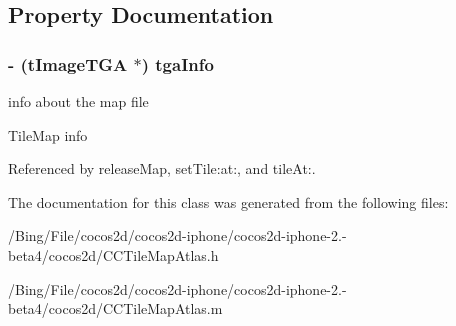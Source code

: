 \subsection{Property Documentation}
\hypertarget{interface_c_c_tile_map_atlas_aaeb4d528af3807a86bd3ea58f0ce27d0}{
\subsubsection[{tga\-Info}]{\setlength{\rightskip}{0pt plus 5cm}-\/ ({\bf t\-Image\-T\-G\-A} $\ast$) {\bf tga\-Info}}}\label{interface_c_c_tile_map_atlas_aaeb4d528af3807a86bd3ea58f0ce27d0}


info about the map file 

Tile\-Map info 

Referenced by release\-Map, set\-Tile\-:at\-:, and tile\-At\-:.



The documentation for this class was generated from the following files\-:\begin{DoxyCompactItemize}
\item 
/\-Bing/\-File/cocos2d/cocos2d-\/iphone/cocos2d-\/iphone-\/2.-\/beta4/cocos2d/C\-C\-Tile\-Map\-Atlas.\-h\item 
/\-Bing/\-File/cocos2d/cocos2d-\/iphone/cocos2d-\/iphone-\/2.-\/beta4/cocos2d/C\-C\-Tile\-Map\-Atlas.\-m\end{DoxyCompactItemize}
